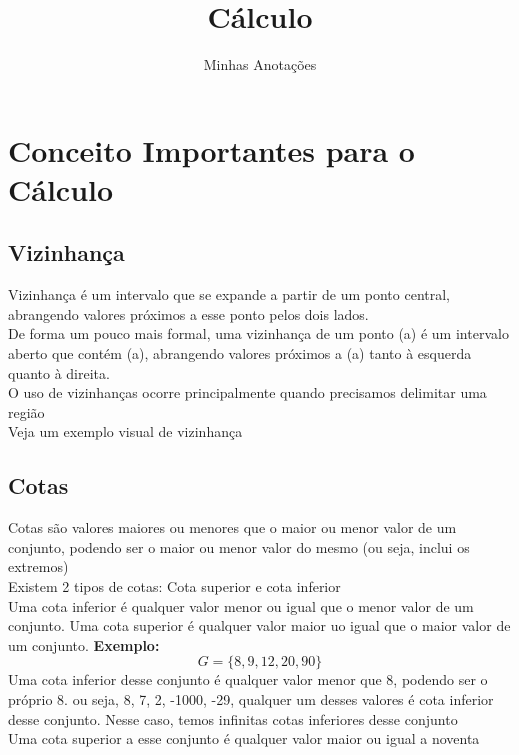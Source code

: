 \documentclass{article}
\title{Cálculo}
\author{Minhas Anotações}
\date{}
\begin{document}
\maketitle
\tableofcontents

\section{Conceito Importantes para o Cálculo}
\subsection{Vizinhança}
Vizinhança é um intervalo que se expande a partir de um ponto central, abrangendo valores próximos a esse ponto pelos dois lados.
\\[2pt]
De forma um pouco mais formal, uma vizinhança de um ponto (a) é um intervalo aberto que contém (a), abrangendo valores próximos a (a) tanto à esquerda quanto à direita.
\\[2pt]
O uso de vizinhanças ocorre principalmente quando precisamos delimitar uma região
\\[2pt]
Veja um exemplo visual de vizinhança

\subsection{Cotas}
Cotas são valores maiores ou menores que o maior ou menor valor de um conjunto, podendo ser o maior ou menor valor do mesmo (ou seja, inclui os extremos)
\\[2pt]
Existem 2 tipos de cotas: Cota superior e cota inferior
\\[2pt]
Uma cota inferior é qualquer valor menor ou igual que o menor valor de um conjunto. Uma cota superior é qualquer valor maior uo igual que o maior valor de um conjunto.
\textbf{Exemplo:}
\[
G = \{8, 9, 12, 20, 90\}
\]
Uma cota inferior desse conjunto é qualquer valor menor que 8, podendo ser o próprio 8. ou seja, 8, 7, 2, -1000, -29, qualquer um desses valores é cota inferior desse conjunto. Nesse caso, temos infinitas cotas inferiores desse conjunto
\\[2pt]
Uma cota superior a esse conjunto é qualquer valor maior ou igual a noventa
\end{document}

